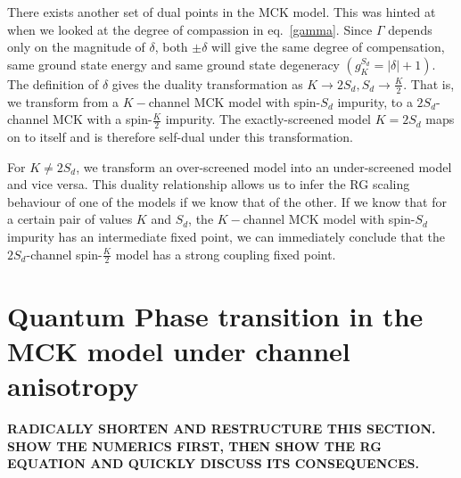 \documentclass[reprint,prb,superscriptaddress]{revtex4-2}
\begin{document}
There exists another set of dual points in the MCK model. This was hinted at when we looked at the degree of compassion in eq.~\ref{gamma}. Since \(\Gamma\) depends only on the magnitude of \(\delta\), both \(\pm \delta\) will give the same degree of compensation, same ground state energy and same ground state degeneracy \(\left(g^{S_d}_K = |\delta|+1\right)\). The definition of \(\delta\) gives the duality transformation as \(K \to 2S_d, S_d \to \frac{K}{2}\). That is, we transform from a \(K-\)channel MCK model with spin-\(S_d\) impurity, to a \(2S_d\)-channel MCK with a spin-\(\frac{K}{2}\) impurity. The exactly-screened model \(K=2S_d\) maps on to itself and is therefore self-dual under this transformation.

For \(K \neq 2S_d\), we transform an over-screened model into an under-screened model and vice versa. This duality relationship allows us to infer the RG scaling behaviour of one of the models if we know that of the other. If we know that for a certain pair of values \(K\) and \(S_d\), the \(K-\)channel MCK model with spin-\(S_d\) impurity has an intermediate fixed point, we can immediately conclude that the \(2S_d\)-channel spin-\(\frac{K}{2}\) model has a strong coupling fixed point.

\section{Quantum Phase transition in the MCK model under channel anisotropy}
\label{anisotropic_rg}
\textbf{RADICALLY SHORTEN AND RESTRUCTURE THIS SECTION. SHOW THE NUMERICS FIRST, THEN SHOW THE RG 
EQUATION AND QUICKLY DISCUSS ITS CONSEQUENCES.}
\end{document}
